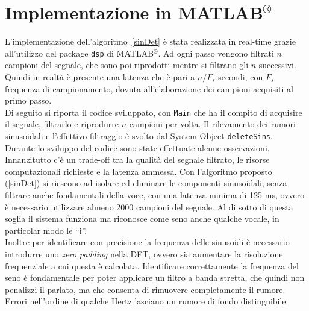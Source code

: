 \documentclass[10pt,A4]{article}
\begin{document}
\clearpage

\section{Implementazione in MATLAB$^{\circledR}$}
L'implementazione dell'algoritmo~\ref{sinDet} è stata realizzata in real-time grazie all'utilizzo del package \texttt{dsp} di MATLAB$^{\circledR}$. Ad ogni passo vengono filtrati $n$ campioni del segnale, che sono poi riprodotti mentre si filtrano gli $n$ successivi. Quindi in realtà è presente una latenza che è pari a $n/F_s$ secondi, con $F_s$ frequenza di campionamento, dovuta all'elaborazione dei campioni acquisiti al primo passo.\\
Di seguito si riporta il codice sviluppato, con \texttt{Main} che ha il compito di acquisire il segnale, filtrarlo e riprodurre $n$ campioni per volta. Il rilevamento dei rumori sinusoidali e l'effettivo filtraggio è svolto dal System Object \texttt{deleteSins}.\\
Durante lo sviluppo del codice sono state effettuate alcune osservazioni. Innanzitutto c'è un trade-off tra la qualità del segnale filtrato, le risorse computazionali richieste e la latenza ammessa. Con l'algoritmo proposto (\ref{sinDet}) si riescono ad isolare ed eliminare le componenti sinusoidali, senza filtrare anche fondamentali della voce, con una latenza minima di 125 ms, ovvero è necessario utilizzare almeno 2000 campioni del segnale. Al di sotto di questa soglia il sistema funziona ma riconosce come seno anche qualche vocale, in particolar modo le ``i''. \\
Inoltre per identificare con precisione la frequenza delle sinusoidi è necessario introdurre uno \textit{zero padding} nella DFT, ovvero sia aumentare la risoluzione frequenziale a cui questa è calcolata. Identificare correttamente la frequenza del seno è fondamentale per poter applicare un filtro a banda stretta, che quindi non penalizzi il parlato, ma che consenta di rimuovere completamente il rumore. Errori nell'ordine di qualche Hertz lasciano un rumore di fondo distinguibile.\\




\end{document}
